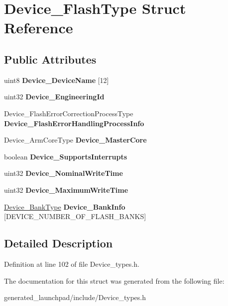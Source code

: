 \hypertarget{structDevice__FlashType}{}\section{Device\+\_\+\+Flash\+Type Struct Reference}
\label{structDevice__FlashType}
\subsection*{Public Attributes}
\begin{DoxyCompactItemize}
\item 
\mbox{\label{structDevice__FlashType_abf78449768dd16799a1283c2d8a27f31}} 
uint8 {\bfseries Device\+\_\+\+Device\+Name} \mbox{[}12\mbox{]}
\item 
\mbox{\label{structDevice__FlashType_a006331d513bceee09739e4c7ad1604e6}} 
uint32 {\bfseries Device\+\_\+\+Engineering\+Id}
\item 
\mbox{\label{structDevice__FlashType_a6969427f9535ca9cd6c479b12d763490}} 
Device\+\_\+\+Flash\+Error\+Correction\+Process\+Type {\bfseries Device\+\_\+\+Flash\+Error\+Handling\+Process\+Info}
\item 
\mbox{\label{structDevice__FlashType_a41262c765932ba4df4e7c3896e079da1}} 
Device\+\_\+\+Arm\+Core\+Type {\bfseries Device\+\_\+\+Master\+Core}
\item 
\mbox{\label{structDevice__FlashType_a91e8ae65b50de5f54117840688d0959e}} 
boolean {\bfseries Device\+\_\+\+Supports\+Interrupts}
\item 
\mbox{\label{structDevice__FlashType_a5a8f268f671af16425aaccb514b39c2a}} 
uint32 {\bfseries Device\+\_\+\+Nominal\+Write\+Time}
\item 
\mbox{\label{structDevice__FlashType_a9264efb04b812fbed8379485b5218cfc}} 
uint32 {\bfseries Device\+\_\+\+Maximum\+Write\+Time}
\item 
\mbox{\label{structDevice__FlashType_af5a83ba03dba6ff5697aefd461b2e647}} 
\mbox{\hyperlink{structDevice__BankType}{Device\+\_\+\+Bank\+Type}} {\bfseries Device\+\_\+\+Bank\+Info} \mbox{[}D\+E\+V\+I\+C\+E\+\_\+\+N\+U\+M\+B\+E\+R\+\_\+\+O\+F\+\_\+\+F\+L\+A\+S\+H\+\_\+\+B\+A\+N\+KS\mbox{]}
\end{DoxyCompactItemize}


\subsection{Detailed Description}


Definition at line 102 of file Device\+\_\+types.\+h.



The documentation for this struct was generated from the following file\+:\begin{DoxyCompactItemize}
\item 
generated\+\_\+launchpad/include/Device\+\_\+types.\+h\end{DoxyCompactItemize}
